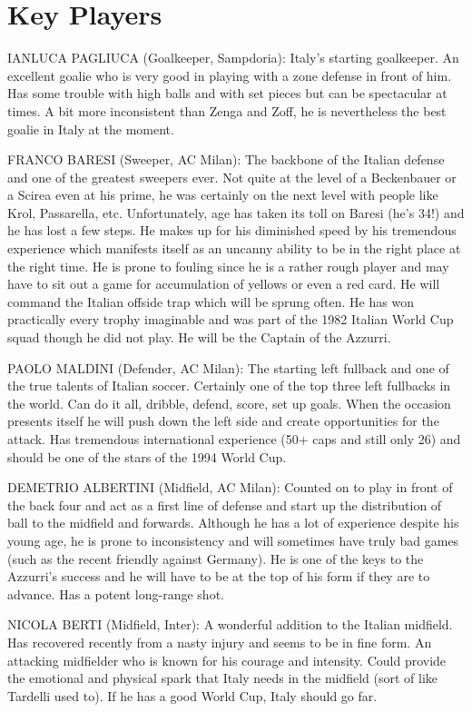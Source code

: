 \section{Key Players}
IANLUCA PAGLIUCA (Goalkeeper, Sampdoria):
Italy's starting goalkeeper. An excellent goalie who is very good in playing 
with a zone defense in front of him. Has some trouble with high balls and with 
set pieces but can be spectacular at times. A bit more inconsistent than Zenga 
and Zoff, he is nevertheless the best goalie in Italy at the moment.

FRANCO BARESI (Sweeper, AC Milan):
The backbone of the Italian defense and one of the greatest sweepers ever. Not
quite at the level of a Beckenbauer or a Scirea even at his prime, he was 
certainly on the next level with people like Krol, Passarella, etc. 
Unfortunately, age has taken its toll on Baresi (he's 34!) and he has lost a 
few steps. He makes up for his diminished speed by his tremendous experience 
which manifests itself as an uncanny ability to be in the right place at the 
right time. He is prone to fouling since he is a rather rough player and may 
have to sit out a game for accumulation of yellows or even a red card. He will 
command the Italian offside trap which will be sprung often. He has won 
practically every trophy imaginable and was part of the 1982 Italian World Cup
squad though he did not play. He will be the Captain of the Azzurri.

PAOLO MALDINI (Defender, AC Milan):
The starting left fullback and one of the true talents of Italian soccer.
Certainly one of the top three left fullbacks in the world. Can do it all, 
dribble, defend, score, set up goals. When the occasion presents itself he will
push down the left side and create opportunities for the attack. Has tremendous
international experience (50+ caps and still only 26) and should be one of the 
stars of the 1994 World Cup.

DEMETRIO ALBERTINI (Midfield, AC Milan):
Counted on to play in front of the back four and act as a first line of defense
and start up the distribution of ball to the midfield and forwards. Although he
has a lot of experience despite his young age, he is prone to inconsistency and
will sometimes have truly bad games (such as the recent friendly against 
Germany). He is one of the keys to the Azzurri's success and he will have to be
at the top of his form if they are to advance. Has a potent long-range shot.

NICOLA BERTI (Midfield, Inter):
A wonderful addition to the Italian midfield. Has recovered recently from a 
nasty injury and seems to be in fine form. An attacking midfielder who is known
for his courage and intensity. Could provide the emotional and physical spark 
that Italy needs in the midfield (sort of like Tardelli used to). If he has a 
good World Cup, Italy should go far.

